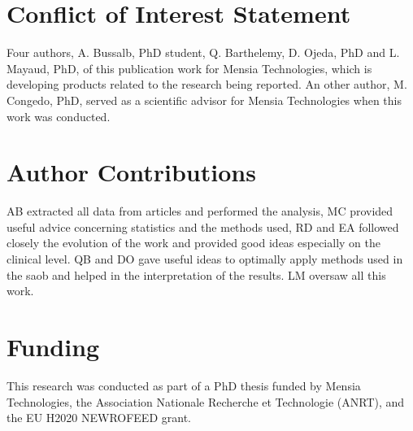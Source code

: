 
\section*{Conflict of Interest Statement}
Four authors, A. Bussalb, PhD student, Q. Barthelemy, D. Ojeda, PhD and L. Mayaud, PhD, of 
this publication work for Mensia Technologies, which is developing products related to the 
research being reported. An other author, M. Congedo, PhD, served as a scientific advisor for Mensia 
Technologies when this work was conducted. 

\section*{Author Contributions}
AB extracted all data from articles and performed the analysis, MC provided useful advice 
concerning statistics and the methods used, RD and EA followed closely the evolution of 
the work and provided good ideas especially on the clinical level. QB and DO gave useful 
ideas to optimally apply methods used in the \gls{saob} and helped in the interpretation 
of the results. LM oversaw all this work. 

\section*{Funding}
This research was conducted as part of a PhD thesis funded by Mensia Technologies, the 
Association Nationale Recherche et Technologie (ANRT), and the EU H2020 NEWROFEED grant.


